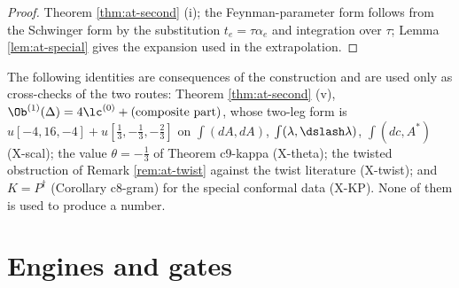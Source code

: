 \begin{proof}
Theorem \ref{thm:at-second} (i); the Feynman-parameter form follows from the Schwinger form by the substitution $t_e=\tau\alpha_e$ and integration over $\tau$; Lemma \ref{lem:at-special} gives the expansion used in the extrapolation.
\end{proof}

\begin{remark}
\label{rem:at-cross}
The following identities are consequences of the construction and are used only as cross-checks of the two routes: Theorem \ref{thm:at-second} (v), $\Ob^{(1)}(\Delta)=4\lc^{(0)}+(\text{composite part})$, whose two-leg form is $u[-4,16,-4]+u[\tfrac13,-\tfrac13,-\tfrac23]$ on $\int(dA,dA)$, $\int(\lambda,\dslash\lambda)$, $\int(dc,A^*)$ (X-scal); the value $\theta=-\tfrac13$ of Theorem c9-kappa (X-theta); the twisted obstruction of Remark \ref{rem:at-twist} against the twist literature (X-twist); and $K=P^\dagger$ (Corollary c8-gram) for the special conformal data (X-KP). None of them is used to produce a number.
\end{remark}

\section{Engines and gates}
\label{sec:at-engines}

